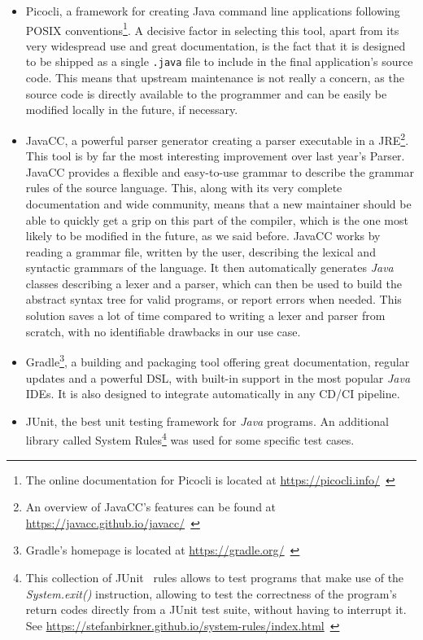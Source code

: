 \begin{itemize}
    \item Picocli, a framework for creating Java command line applications following POSIX conventions\footnote{The online documentation for Picocli is located at \url{https://picocli.info/}~\cite{picocli}}.
    A decisive factor in selecting this tool, apart from its very widespread use and great documentation, is the fact that it is designed to be shipped as a single \texttt{.java} file to include in the final application's source code.
    This means that upstream maintenance is not really a concern, as the source code is directly available to the programmer and can be easily be modified locally in the future, if necessary.
    \item JavaCC, a powerful parser generator creating a parser executable in a JRE\footnote{An overview of JavaCC's features can be found at \url{https://javacc.github.io/javacc/}~\cite{javacc}}.
    This tool is by far the most interesting improvement over last year's Parser.
    JavaCC provides a flexible and easy-to-use grammar to describe the grammar rules of the source language.
    This, along with its very complete documentation and wide community, means that a new maintainer should be able to quickly get a grip on this part of the compiler, which is the one most likely to be modified in the future, as we said before.
    JavaCC works by reading a grammar file, written by the user, describing the lexical and syntactic grammars of the language.
    It then automatically generates \textit{Java} classes describing a lexer and a parser, which can then be used to build the abstract syntax tree for valid programs, or report errors when needed.
    This solution saves a lot of time compared to writing a lexer and parser from scratch, with no identifiable drawbacks in our use case.
    \item Gradle\footnote{Gradle's homepage is located at \url{https://gradle.org/}~\cite{gradle}}, a building and packaging tool offering great documentation, regular updates and a powerful DSL, with built-in support in the most popular \textit{Java} IDEs.
    It is also designed to integrate automatically in any CD/CI pipeline.
    \item JUnit, the best unit testing framework for \textit{Java} programs.
    An additional library called System Rules\footnote{This collection of JUnit~\cite{JUnit} rules allows to test programs that make use of the \textit{System.exit()} instruction, allowing to test the correctness of the program's return codes directly from a JUnit test suite, without having to interrupt it. See \url{https://stefanbirkner.github.io/system-rules/index.html}~\cite{SystemRules}} was used for some specific test cases.
\end{itemize}
